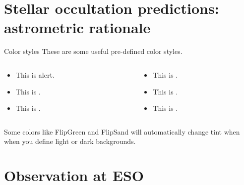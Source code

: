 
\section{Stellar occultation predictions: astrometric rationale}
\begin{frame}[c]{Color styles}
	These are some useful pre-defined color styles.
	
		\begin{columns}[t]
		\begin{column}[T]{5cm}
			\begin{itemize}
			\item This is \alert{alert}.
			\item This is .
			\item This is .
			\end{itemize}
		\end{column}

		\begin{column}[T]{5cm}
			\begin{itemize}
			\item This is .
			\item This is .
			\item This is .
			\end{itemize}
		\end{column}
		\end{columns}
		\vspace{1em}
		Some colors like \textcolor{FlipGreen}{FlipGreen} and \textcolor{FlipSand}{FlipSand} will automatically change tint when when you define light or dark backgrounds. 
		
		\vspace{1em}
\end{frame}


\section{Observation at ESO}

